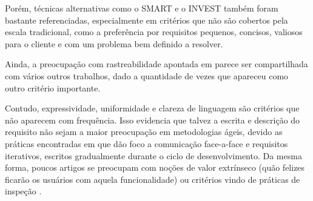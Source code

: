 Porém, técnicas alternativas como o SMART e o INVEST \cite{SMART_INVEST_2013} também foram bastante referenciadas, especialmente em critérios que não são cobertos pela escala tradicional, como a preferência por requisitos pequenos, concisos, valiosos para o cliente e com um problema bem definido a resolver. 

Ainda, a preocupação com rastreabilidade apontada em \cite{Inayat_2015} parece ser compartilhada com vários outros trabalhos, dado a quantidade de vezes que apareceu como outro critério importante.

Contudo, expressividade, uniformidade e clareza de linguagem são critérios que não aparecem com frequência. Isso evidencia que talvez a escrita e descrição do requisito não sejam a maior preocupação em metodologias ágeis, devido as práticas encontradas em \cite{Inayat_2015} que dão foco a comunicação face-a-face e requisitos iterativos, escritos gradualmente durante o ciclo de desenvolvimento. Da mesma forma, poucos artigos se preocupam com noções de valor extrínseco (quão felizes ficarão os usuários com aquela funcionalidade) \cite{KANO84} ou critérios vindo de práticas de inspeção \cite{Saito_PQM_13}.

